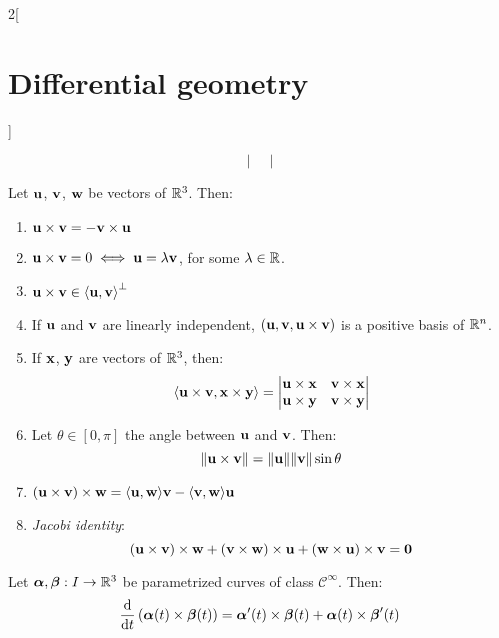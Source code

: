 \documentclass[../../../main.tex]{subfiles}
\begin{document}
\begin{multicols}{2}[\section{Differential geometry}]
\begin{proposition}
$$\begin{vmatrix}
      \end{vmatrix}$$
  \end{proposition}
  \begin{proposition}
    Let $\vf{u}$, $\vf{v}$, $\vf{w}$ be vectors of $\RR^3$. Then:
    \begin{enumerate}
      \item $\vf{u}\times\vf{v}=-\vf{v}\times\vf{u}$
      \item $\vf{u}\times\vf{v}=0\iff\vf{u}=\lambda\vf{v}$, for some $\lambda\in\RR$.
      \item $\vf{u}\times\vf{v}\in{\langle\vf{u},\vf{v}\rangle}^{\perp}$
      \item If $\vf{u}$ and $\vf{v}$ are linearly independent, $(\vf{u},\vf{v},\vf{u}\times\vf{v})$ is a positive basis of $\RR^n$.
      \item If $\vf{x}$, $\vf{y}$ are vectors of $\RR^3$, then: $$\langle\vf{u}\times\vf{v},\vf{x}\times\vf{y}\rangle=
              \begin{vmatrix}
                \vf{u}\times\vf{x} & \vf{v}\times\vf{x} \\
                \vf{u}\times\vf{y} & \vf{v}\times\vf{y} \\
              \end{vmatrix}$$
      \item Let $\theta\in[0,\pi]$ the angle between $\vf{u}$ and $\vf{v}$. Then: $$\|\vf{u}\times\vf{v}\|=\|\vf{u}\|\|\vf{v}\|\sin\theta$$
      \item $(\vf{u}\times\vf{v})\times\vf{w}=\langle\vf{u},\vf{w}\rangle\vf{v}-\langle\vf{v},\vf{w}\rangle\vf{u}$
      \item \emph{Jacobi identity}: $$(\vf{u}\times\vf{v})\times\vf{w}+(\vf{v}\times\vf{w})\times\vf{u}+(\vf{w}\times\vf{u})\times\vf{v}=\vf{0}$$
    \end{enumerate}
  \end{proposition}
  \begin{proposition}
    Let $\vf{\alpha},\vf{\beta}:I\rightarrow\RR^3$ be parametrized curves of class $\mathcal{C}^\infty$. Then:
    $$\dv{}{t}\left(\vf{\alpha}(t)\times\vf{\beta}(t)\right)=\vf{\alpha}'(t)\times\vf{\beta}(t)+\vf{\alpha}(t)\times\vf{\beta}'(t)$$
  \end{proposition}

\end{multicols}
\end{document}
